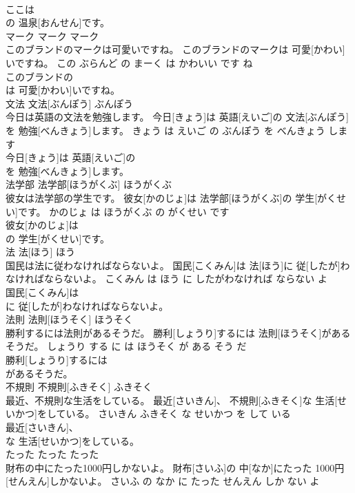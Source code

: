 \documentclass[8pt]{extreport}
\begin{document}
\begin{CJK}{UTF8}{min}
\\	ここは
\\	の 温泉[おんせん]です。			
\\	マーク	マーク	マーク	
\\	このブランドのマークは可愛いですね。	このブランドのマークは 可愛[かわい]いですね。	この ぶらんど の まーく は かわいい です ね	
\\	このブランドの
\\	は 可愛[かわい]いですね。			
\\	文法	文法[ぶんぽう]	ぶんぽう	
\\	今日は英語の文法を勉強します。	今日[きょう]は 英語[えいご]の 文法[ぶんぽう]を 勉強[べんきょう]します。	きょう は えいご の ぶんぽう を べんきょう します	
\\	今日[きょう]は 英語[えいご]の
\\	を 勉強[べんきょう]します。			
\\	法学部	法学部[ほうがくぶ]	ほうがくぶ	
\\	彼女は法学部の学生です。	彼女[かのじょ]は 法学部[ほうがくぶ]の 学生[がくせい]です。	かのじょ は ほうがくぶ の がくせい です	
\\	彼女[かのじょ]は
\\	の 学生[がくせい]です。			
\\	法	法[ほう]	ほう	
\\	国民は法に従わなければならないよ。	国民[こくみん]は 法[ほう]に 従[したが]わなければならないよ。	こくみん は ほう に したがわなければ ならない よ	
\\	国民[こくみん]は
\\	に 従[したが]わなければならないよ。			
\\	法則	法則[ほうそく]	ほうそく	
\\	勝利するには法則があるそうだ。	勝利[しょうり]するには 法則[ほうそく]があるそうだ。	しょうり する に は ほうそく が ある そう だ	
\\	勝利[しょうり]するには
\\	があるそうだ。			
\\	不規則	不規則[ふきそく]	ふきそく	
\\	最近、不規則な生活をしている。	最近[さいきん]、 不規則[ふきそく]な 生活[せいかつ]をしている。	さいきん ふきそく な せいかつ を して いる	
\\	最近[さいきん]、
\\	な 生活[せいかつ]をしている。			
\\	たった	たった	たった	
\\	財布の中にたった1000円しかないよ。	財布[さいふ]の 中[なか]にたった 1000円[せんえん]しかないよ。	さいふ の なか に たった せんえん しか ない よ	

\end{CJK}
\end{document}
